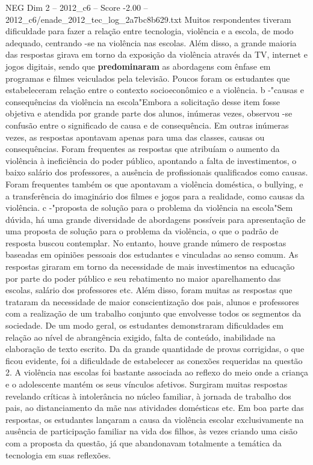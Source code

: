 \begin{textsample}{NEG Dim 2 – 2012\_c6 – Score -2.00 – 2012\_c6/enade\_2012\_tec\_log\_2a7bc8b629.txt}
Muitos respondentes tiveram dificuldade para fazer a relação entre tecnologia, violência e a escola, de modo adequado, centrando -se na violência nas escolas.
Além disso, a grande maioria das respostas girava em torno da exposição da violência através da TV, internet e jogos digitais, sendo que \textbf{predominaram} as abordagens com ênfase em programas e filmes veiculados pela televisão.
Poucos foram os estudantes que estabeleceram relação entre o contexto socioeconômico e a violência. b -"causas e consequências da violência na escola"Embora a solicitação desse item fosse objetiva e atendida por grande parte dos alunos, inúmeras vezes, observou -se confusão entre o significado de causa e de consequência.
Em outras inúmeras vezes, as respostas apontavam apenas para uma das classes, causas ou consequências.
Foram frequentes as respostas que atribuíam o aumento da violência à ineficiência do poder público, apontando a falta de investimentos, o baixo salário dos professores, a ausência de profissionais qualificados como causas.
Foram frequentes também os que apontavam a violência doméstica, o bullying, e a transferência do imaginário dos filmes e jogos para a realidade, como causas da violência. c -"proposta de solução para o problema da violência na escola"Sem dúvida, há uma grande diversidade de abordagens possíveis para apresentação de uma proposta de solução para o problema da violência, o que o padrão de resposta buscou contemplar.
No entanto, houve grande número de respostas baseadas em opiniões pessoais dos estudantes e vinculadas ao senso comum.
As respostas giraram em torno da necessidade de mais investimentos na educação por parte do poder público e seu rebatimento no maior aparelhamento das escolas, salário dos professores etc.
Além disso, foram muitas as respostas que trataram da necessidade de maior conscientização dos pais, alunos e professores com a realização de um trabalho conjunto que envolvesse todos os segmentos da sociedade.
De um modo geral, os estudantes demonstraram dificuldades em relação ao nível de abrangência exigido, falta de conteúdo, inabilidade na elaboração de texto escrito.
Da da grande quantidade de provas corrigidas, o que ficou evidente, foi a dificuldade de estabelecer as conexões requeridas na questão 2.
A violência nas escolas foi bastante associada ao reflexo do meio onde a criança e o adolescente mantém os seus vínculos afetivos.
Surgiram muitas respostas revelando críticas à intolerância no núcleo familiar, à jornada de trabalho dos pais, ao distanciamento da mãe nas atividades domésticas etc.
Em boa parte das respostas, os estudantes lançaram a causa da violência escolar exclusivamente na ausência de participação familiar na vida dos filhos, às vezes criando uma cisão com a proposta da questão, já que abandonavam totalmente a temática da tecnologia em suas reflexões.

\end{textsample}
